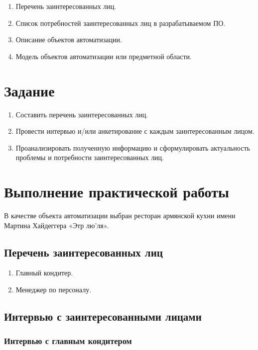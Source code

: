 \begin{enumerate}
	\item{Перечень заинтересованных лиц.}
	\item{Список потребностей заинтересованных лиц в разрабатываемом ПО.}
	\item{Описание объектов автоматизации.}
	\item{Модель объектов автоматизации или предметной области.}
\end{enumerate}

\section{Задание}

\begin{enumerate}
	\item{Составить перечень заинтересованных лиц.}
	\item{Провести интервью и/или анкетирование с каждым заинтересованным лицом.}
	\item{Проанализировать полученную информацию и сформулировать актуальность проблемы и потребности заинтересованных лиц.}
\end{enumerate}

\section{Выполнение практической работы}

В качестве объекта автоматизации выбран ресторан армянской кухни имени Мартина Хайдеггера «Этр лю’ля».

\subsection{Перечень заинтересованных лиц}

\begin{enumerate}
	\item{Главный кондитер.}
	\item{Менеджер по персоналу.}
\end{enumerate}

\subsection{Интервью с заинтересованными лицами}

\subsubsection{Интервью с главным кондитером}

